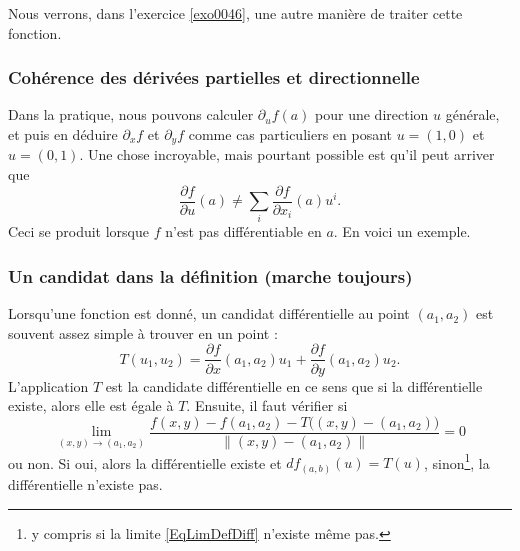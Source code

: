 \begin{example}
Nous verrons, dans l'exercice \ref{exo0046}, une autre manière de traiter cette fonction.
\end{example}

                    \subsubsection{Cohérence des dérivées partielles et directionnelle}

Dans la pratique, nous pouvons calculer $\partial_uf(a)$ pour une direction $u$ générale, et puis en déduire $\partial_xf$ et $\partial_yf$ comme cas particuliers en posant $u=(1,0)$ et $u=(0,1)$. Une chose incroyable, mais pourtant possible est qu'il peut arriver que
\begin{equation}
    \frac{ \partial f }{ \partial u }(a)\neq \sum_i\frac{ \partial f }{ \partial x_i }(a)u^i.
\end{equation}
Ceci se produit lorsque $f$ n'est pas différentiable en $a$. En voici un exemple.

                    \subsubsection{Un candidat dans la définition (marche toujours)}

Lorsqu'une fonction est donné, un candidat différentielle au point $(a_1,a_2)$ est souvent assez simple à trouver en un point :
\begin{equation}
    T(u_1,u_2)=\frac{ \partial f }{ \partial x }(a_1,a_2)u_1+\frac{ \partial f }{ \partial y }(a_1,a_2)u_2.
\end{equation}
L'application $T$ est la candidate différentielle en ce sens que si la différentielle existe, alors elle est égale à $T$. Ensuite, il faut vérifier si
\begin{equation}        \label{EqLimDefDiff}
    \lim_{(x,y)\to (a_1,a_2)} \frac{f(x,y) - f(a_1,a_2) - T\big( (x,y)-(a_1,a_2) \big)}{\| (x,y)-(a_1,a_2) \|}=0
\end{equation}
ou non. Si oui, alors la différentielle existe et $df_{(a,b)}(u)=T(u)$, sinon\footnote{y compris si la limite \eqref{EqLimDefDiff} n'existe même pas.}, la différentielle n'existe pas.

